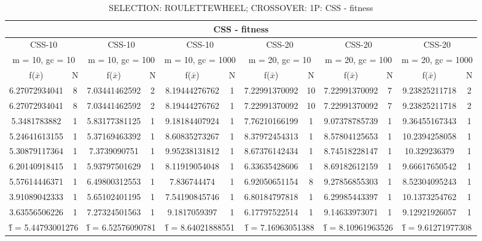 \begin{table}[H]
	\centering
	\caption{SELECTION: ROULETTEWHEEL; CROSSOVER: 1P: CSS - fitness}
	\begin{adjustbox}{width=1\textwidth}
		\begin{tabular}{ |c|c||c|c||c|c||c|c||c|c||c|c| }
			\hline
			\multicolumn{12}{|c|}{CSS - fitness} \\
			\hline
			\multicolumn{2}{|c||}{CSS-10} & \multicolumn{2}{c||}{CSS-10} & \multicolumn{2}{c||}{CSS-10} & \multicolumn{2}{c||}{CSS-20} & \multicolumn{2}{c||}{CSS-20} & \multicolumn{2}{c|}{CSS-20}\\
			\hline
			\multicolumn{2}{|c||}{m = 10, gc = 10} & \multicolumn{2}{c||}{m = 10, gc = 100} & \multicolumn{2}{c||}{m = 10, gc = 1000} & \multicolumn{2}{c||}{m = 20, gc = 10} & \multicolumn{2}{c||}{m = 20, gc = 100} & \multicolumn{2}{c|}{m = 20, gc = 1000}\\
			\hline
			f($\bar{x}$) & N & f($\bar{x}$) & N & f($\bar{x}$) & N & f($\bar{x}$) & N & f($\bar{x}$) & N & f($\bar{x}$) & N\\
			\hline
			\hline
			6.27072934041 & 8 & 7.03441462592 & 2 & 8.19444276762 & 1 & 7.22991370092 & 10 & 7.22991370092 & 7 & 9.23825211718 & 2\\
			\hline
			6.27072934041 & 8 & 7.03441462592 & 2 & 8.19444276762 & 1 & 7.22991370092 & 10 & 7.22991370092 & 7 & 9.23825211718 & 2\\
			5.3481783882 & 1 & 5.83177381125 & 1 & 9.18184407924 & 1 & 7.76210166199 & 1 & 9.07378785739 & 1 & 9.36455167343 & 1\\
			5.24641613155 & 1 & 5.37169463392 & 1 & 8.60835273267 & 1 & 8.37972454313 & 1 & 8.57804125653 & 1 & 10.2394258058 & 1\\
			5.30879117364 & 1 & 7.3739090751 & 1 & 9.95238131812 & 1 & 8.67376142434 & 1 & 8.74518228147 & 1 & 10.329236379 & 1\\
			6.20140918415 & 1 & 5.93797501629 & 1 & 8.11919054048 & 1 & 6.33635428606 & 1 & 8.69182612159 & 1 & 9.66617650542 & 1\\
			5.57614446371 & 1 & 6.49800312553 & 1 & 7.836744474 & 1 & 6.92050651154 & 8 & 9.27856855303 & 1 & 8.52304095243 & 1\\
			3.91089042333 & 1 & 5.65102401195 & 1 & 7.54190845746 & 1 & 6.80184797818 & 1 & 6.29985443397 & 1 & 10.1373254762 & 1\\
			3.63556506226 & 1 & 7.27324501563 & 1 & 9.1817059397 & 1 & 6.17797522514 & 1 & 9.14633973071 & 1 & 9.12921926057 & 1\\
			\hline
			\multicolumn{2}{|c||}{\^{f} = 5.44793001276} & \multicolumn{2}{c||}{\^{f} = 6.52576090781} & \multicolumn{2}{c||}{\^{f} = 8.64021888551} & \multicolumn{2}{c||}{\^{f} = 7.16963051388} & \multicolumn{2}{c||}{\^{f} = 8.10961963526} & \multicolumn{2}{c|}{\^{f} = 9.61271977308}\\
			\hline
		\end{tabular}
	\end{adjustbox}
\end{table}

